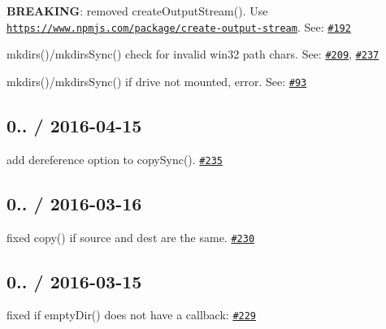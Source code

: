 \begin{DoxyItemize}
\item {\bfseries B\+R\+E\+A\+K\+I\+NG}\+: removed {\ttfamily create\+Output\+Stream()}. Use \href{https://www.npmjs.com/package/create-output-stream}{\tt https\+://www.\+npmjs.\+com/package/create-\/output-\/stream}. See\+: \href{https://github.com/jprichardson/node-fs-extra/issues/192}{\tt \#192}
\item {\ttfamily mkdirs()/mkdirs\+Sync()} check for invalid win32 path chars. See\+: \href{https://github.com/jprichardson/node-fs-extra/issues/209}{\tt \#209}, \href{https://github.com/jprichardson/node-fs-extra/issues/237}{\tt \#237}
\item {\ttfamily mkdirs()/mkdirs\+Sync()} if drive not mounted, error. See\+: \href{https://github.com/jprichardson/node-fs-extra/issues/93}{\tt \#93}
\end{DoxyItemize}

\subsection*{0.. / 2016-\/04-\/15 }


\begin{DoxyItemize}
\item add {\ttfamily dereference} option to {\ttfamily copy\+Sync()}. \href{https://github.com/jprichardson/node-fs-extra/pull/235}{\tt \#235}
\end{DoxyItemize}

\subsection*{0.. / 2016-\/03-\/16 }


\begin{DoxyItemize}
\item fixed {\ttfamily copy()} if source and dest are the same. \href{https://github.com/jprichardson/node-fs-extra/pull/230}{\tt \#230}
\end{DoxyItemize}

\subsection*{0.. / 2016-\/03-\/15 }


\begin{DoxyItemize}
\item fixed if {\ttfamily empty\+Dir()} does not have a callback\+: \href{https://github.com/jprichardson/node-fs-extra/pull/229}{\tt \#229}
\end{DoxyItemize}


